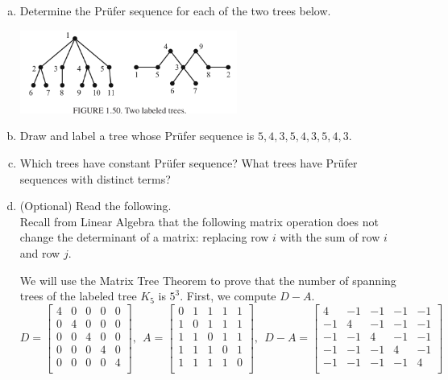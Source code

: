 \documentclass[10pt]{amsart}
\begin{document}
\begin{enumerate}[a.)]
	
\item 
Determine the Pr\"{u}fer sequence for each of the two trees below.

\includegraphics[width=2.8in]{reading16.png}

\bigskip
	
\item 
Draw and label a tree whose Pr\"{u}fer sequence is $5, 4, 3, 5, 4, 3, 5, 4, 3.$

\bigskip
	
\item 
Which trees have constant Pr\"{u}fer sequence? 
What trees have Pr\"{u}fer sequences with distinct terms?

\bigskip

\item 
(Optional) Read the following. 	\\
Recall from Linear Algebra that the following matrix operation does not change the determinant of a matrix: replacing row $i$ with the sum of row $i$ and row $j$.
	
	
We will use the Matrix Tree Theorem to prove that the number of spanning trees of the labeled tree $K_5$ is $5^3$. 
First, we compute $D-A$.
\begin{equation*}
D=\begin{bmatrix}
4 & 0 & 0 & 0 & 0\\
0 & 4 & 0 & 0 & 0\\
0 & 0 & 4 & 0 & 0\\
0 & 0 & 0 & 4 & 0\\
0 & 0 & 0 & 0 & 4\\
\end{bmatrix},
~~
A=\begin{bmatrix}
0 & 1 & 1 & 1 & 1\\
1 & 0 & 1 & 1 & 1\\
1 & 1 & 0 & 1 & 1\\
1 & 1 & 1 & 0 & 1\\
1 & 1 & 1 & 1 & 0\\
\end{bmatrix},
~~
D-A=\begin{bmatrix}
4 & -1 & -1 & -1 & -1\\
-1 & 4 & -1 & -1 & -1\\
-1 & -1 & 4 & -1 & -1\\
-1 & -1 & -1 & 4 & -1\\
-1 & -1 & -1 & -1 & 4\\
\end{bmatrix}
\end{equation*}


\end{enumerate}
\end{document}
